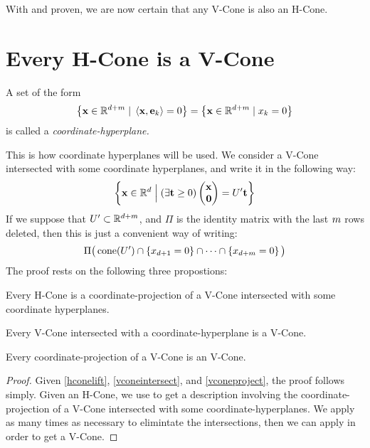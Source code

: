 With  and  proven, we are now certain that any V-Cone is also an H-Cone.

\section{Every H-Cone is a V-Cone}

\begin{Def}
	A set of the form
	\[ \left\{\mathbf{x} \in \mathbb{R}^{d+m} \;|\; \left\langle \mathbf{x}, \mathbf{e}_k \right\rangle = 0\right\} =
		\left\{\mathbf{x} \in \mathbb{R}^{d+m} \;|\; x_k = 0\right\}
	\]
	is called a \em{coordinate-hyperplane}.
\end{Def}

This is how coordinate hyperplanes will be used.  We consider a V-Cone intersected with some coordinate hyperplanes, and write it in the following way:
\begin{equation}\label{eq:coneintform1}
	\set{\xv \St (\exists \t \geq 0) \xz = U'\t}
\end{equation}
If we suppose that $U' \subset \mathbb{R}^{d+m}$, and $\Pi$ is the identity matrix with the last $m$ rows deleted, then this is just a convenient way of writing:
\begin{equation}\label{eq:coneintform2}
	\Pi\big(\operatorname{cone}(U') \cap \left\{x_{d+1} = 0\right\}
	\cap \dots \cap \left\{x_{d+m} = 0\right\}\big)
\end{equation}
The proof rests on the following three propostions:
\begin{Lemma}\label{hconelift}
  Every H-Cone is a coordinate-projection of a V-Cone intersected with some coordinate hyperplanes.
\end{Lemma}
\begin{Lemma}\label{vconeintersect}
  Every V-Cone intersected with a coordinate-hyperplane is a V-Cone.
\end{Lemma}
\begin{Lemma}\label{vconeproject}
  Every coordinate-projection of a V-Cone is an V-Cone.
\end{Lemma}

\begin{proof}
	Given \cref{hconelift}, \cref{vconeintersect}, and \cref{vconeproject}, the proof follows simply.  Given an H-Cone, we use  to get a description involving the coordinate-projection of a V-Cone intersected with some coordinate-hyperplanes.  We apply  as many times as necessary to elimintate the intersections, then we can apply  in order to get a V-Cone.
\end{proof}

